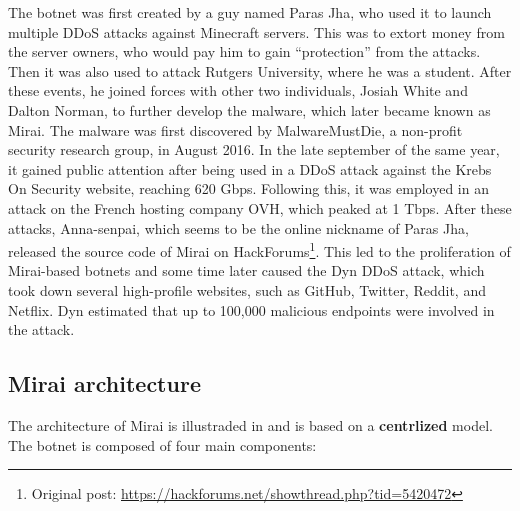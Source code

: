 The botnet was first created by a guy named Paras Jha, who used it to launch multiple DDoS attacks against Minecraft servers. This was to extort money from the server owners, who would pay him to gain ``protection'' from the attacks. Then it was also used to attack Rutgers University, where he was a student. After these events, he joined forces with other two individuals, Josiah White and Dalton Norman, to further develop the malware, which later became known as Mirai. The malware was first discovered by MalwareMustDie, a non-profit security research group, in August 2016. In the late september of the same year, it gained public attention after being used in a DDoS attack against the Krebs On Security website, reaching 620 Gbps. Following this, it was employed in an attack on the French hosting company OVH, which peaked at 1 Tbps. After these attacks, Anna-senpai, which seems to be the online nickname of Paras Jha, released the source code of Mirai on HackForums\footnote{Original post: \url{https://hackforums.net/showthread.php?tid=5420472}}. This led to the proliferation of Mirai-based botnets and some time later caused the Dyn DDoS attack, which took down several high-profile websites, such as GitHub, Twitter, Reddit, and Netflix. Dyn estimated that up to 100,000 malicious endpoints were involved in the attack. \cite{8115504}

\subsection{Mirai architecture}

The architecture of Mirai is illustraded in  and is based on a \textbf{centrlized} model. The botnet is composed of four main components: 

